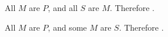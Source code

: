 \begin{exercises}

\item All $M$ are $P$, and all $S$ are $M$. Therefore \underline{\hspace{2cm}}.

\item All $M$ are $P$, and some $M$ are $S$. Therefore \underline{\hspace{2cm}}.


\end{exercises}
